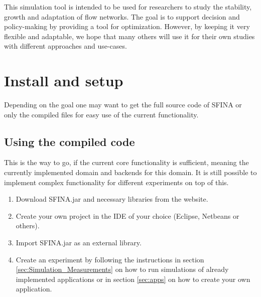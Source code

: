 \documentclass[11pt,fleqn]{book} %
\newcommand{\backend}[1][]{backend#1}
\newcommand{\domain}[1][]{domain#1}
\begin{document}
This simulation tool is intended to be used for researchers to study the stability, growth and adaptation of flow networks. The goal is to support decision and policy-making by providing a tool for optimization. However, by keeping it very flexible and adaptable, we hope that many others will use it for their own studies with different approaches and use-cases.

\section{Install and setup}
Depending on the goal one may want to get the full source code of SFINA or only the compiled files for easy use of the current functionality.

\subsection{Using the compiled code}
This is the way to go, if the current core functionality is sufficient, meaning the currently implemented \domain{} and \backend{s} for this \domain{}. It is still possible to implement complex functionality for different experiments on top of this.

\begin{enumerate}
	\item Download SFINA.jar and necessary libraries from the website.
	\item Create your own project in the IDE of your choice (Eclipse, Netbeans or others).
	\item Import SFINA.jar as an external library.
	\item Create an experiment by following the instructions in section \ref{sec:Simulation_Measurements} on how to run simulations of already implemented applications or in section \ref{sec:apps} on how to create your own application.
\end{enumerate}
\end{document}
